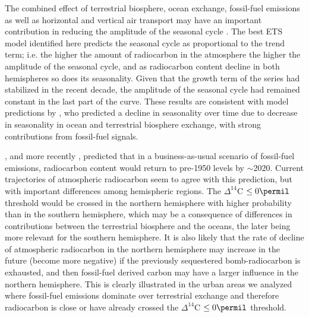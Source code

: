 The combined effect of terrestrial biosphere, ocean exchange, fossil-fuel emissions as well as horizontal and vertical air transport may have an important contribution in reducing the amplitude of the seasonal cycle \citep{Levin2010Tellus}. The best ETS model identified here predicts the seasonal cycle as proportional to the trend term; i.e. the higher the amount of radiocarbon in the atmosphere the higher the amplitude of the seasonal cycle, and as radiocarbon content decline in both hemispheres so does its seasonality. Given that the growth term of the series had stabilized in the recent decade, the amplitude of the seasonal cycle had remained constant in the last part of the curve. These results are consistent with model predictions by \citet{Randerson2002GBC}, who predicted a decline in seasonality over time due to decrease in seasonality in ocean and terrestrial biosphere exchange, with strong contributions from fossil-fuel signals. 


\citet{Caldeira1998GRL}, and more recently \citet{Graven2015PNAS}, predicted that in a business-as-usual scenario of fossil-fuel emissions, radiocarbon content would return to pre-1950 levels by $\sim$2020. Current trajectories of atmospheric radiocarbon seem to agree with this prediction, but with important differences among hemispheric regions. The $\Delta^{14}$C $\leq 0 \permil$ threshold would be crossed in the northern hemisphere with higher probability than in the southern hemisphere, which may be a consequence of differences in contributions between the terrestrial biosphere and the oceans, the later being more relevant for the southern hemisphere. 
It is also likely that the rate of decline of atmospheric radiocarbon in the northern hemisphere may increase in the future (become more negative) if the previously sequestered bomb-radiocarbon is exhausted, and then fossil-fuel derived carbon may have a larger influence in the northern hemisphere. This is clearly illustrated in the urban areas we analyzed where fossil-fuel emissions dominate over terrestrial exchange  and therefore radiocarbon is close or have already crossed the $\Delta^{14}$C $\leq 0 \permil$ threshold. 

